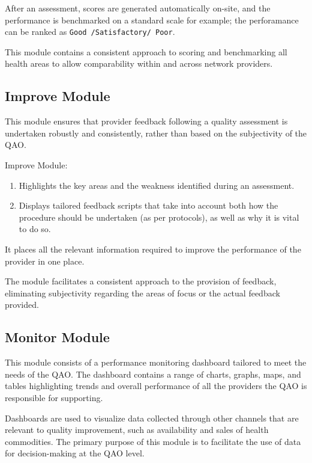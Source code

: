 \documentclass[]{book}
\providecommand{\tightlist}{%
  \setlength{\itemsep}{0pt}\setlength{\parskip}{0pt}}
\begin{document}
After an assessment, scores are generated automatically on-site, and the performance is benchmarked on a standard scale for example; the perforamance can be ranked as \texttt{Good\ /Satisfactory/\ Poor}.

This module contains a consistent approach to scoring and benchmarking all health areas to allow comparability within and across network providers.

\hypertarget{improve-module}{%
\subsection{Improve Module}\label{improve-module}}

This module ensures that provider feedback following a quality assessment is undertaken robustly and consistently, rather than based on the subjectivity of the QAO.

Improve Module:

\begin{enumerate}
\def\labelenumi{\arabic{enumi}.}
\tightlist
\item
  Highlights the key areas and the weakness identified during an assessment.
\item
  Displays tailored feedback scripts that take into account both how the procedure should be undertaken (as per protocols), as well as why it is vital to do so.
\end{enumerate}

It places all the relevant information required to improve the performance of the provider in one place.

The module facilitates a consistent approach to the provision of feedback, eliminating subjectivity regarding the areas of focus or the actual feedback provided.

\hypertarget{monitor-module}{%
\subsection{Monitor Module}\label{monitor-module}}

This module consists of a performance monitoring dashboard tailored to meet the needs of the QAO. The dashboard contains a range of charts, graphs, maps, and tables highlighting trends and overall performance of all the providers the QAO is responsible for supporting.

Dashboards are used to visualize data collected through other channels that are relevant to quality improvement, such as availability and sales of health commodities. The primary purpose of this module is to facilitate the use of data for decision-making at the QAO level.
\end{document}
